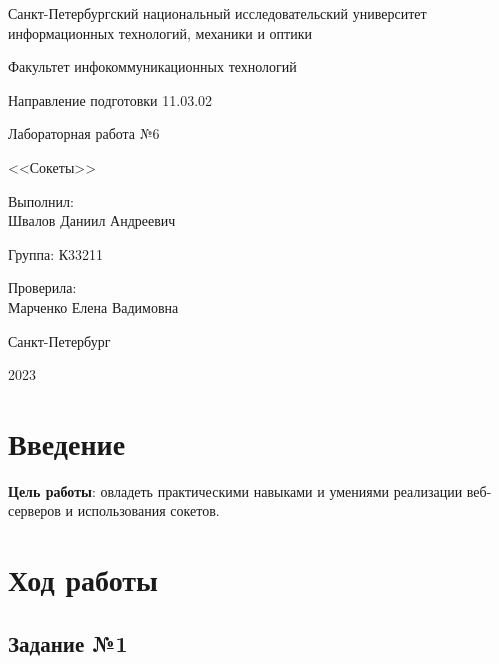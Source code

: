 \documentclass[a4paper, 14pt]{extarticle}
\begin{document}
\begin{titlepage}
  \vspace{0pt plus2fill}
  \noindent

  \vspace{0pt plus6fill}
  \begin{center}
    Санкт-Петербургский национальный исследовательский университет
    информационных технологий, механики и оптики

    \vspace{0pt plus3fill}

    Факультет инфокоммуникационных технологий

    Направление подготовки 11.03.02

    \vspace{0pt plus2fill}

    Лабораторная работа №6

    <<Сокеты>>

  \end{center}

  \vspace{0pt plus9fill}
  \begin{flushright}
    Выполнил: \\
    Швалов Даниил Андреевич

    Группа: К33211

    Проверила: \\
    Марченко Елена Вадимовна
  \end{flushright}

  \vspace{0pt plus2fill}
  \begin{center}
    Санкт-Петербург

    2023
  \end{center}
\end{titlepage}

\section{Введение}

\textbf{Цель работы}: овладеть практическими навыками и умениями реализации
веб-серверов и использования сокетов.

\section{Ход работы}

\subsection*{Задание №1}
\end{document}
